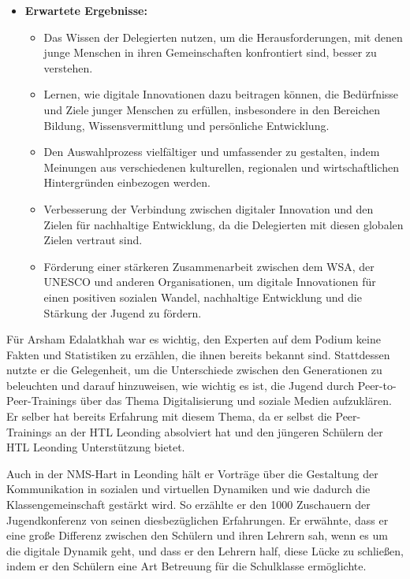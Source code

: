 \begin{itemize}
    \item \textbf{Erwartete Ergebnisse:}
          \begin{itemize}
              \item {Das Wissen der Delegierten nutzen, um die Herausforderungen, mit denen junge Menschen in ihren Gemeinschaften konfrontiert sind, besser zu verstehen.}
              \item {Lernen, wie digitale Innovationen dazu beitragen können, die Bedürfnisse und Ziele junger Menschen zu erfüllen, insbesondere in den Bereichen Bildung, Wissensvermittlung und persönliche Entwicklung.}
              \item {Den Auswahlprozess vielfältiger und umfassender zu gestalten, indem Meinungen aus verschiedenen kulturellen, regionalen und wirtschaftlichen Hintergründen einbezogen werden.}
              \item {Verbesserung der Verbindung zwischen digitaler Innovation und den Zielen für nachhaltige Entwicklung, da die Delegierten mit diesen globalen Zielen vertraut sind.}
              \item {Förderung einer stärkeren Zusammenarbeit zwischen dem WSA, der UNESCO und anderen Organisationen, um digitale Innovationen für einen positiven sozialen Wandel, nachhaltige Entwicklung und die Stärkung der Jugend zu fördern.}
          \end{itemize}
\end{itemize}


Für Arsham Edalatkhah war es wichtig, den Experten auf dem Podium keine Fakten und Statistiken zu erzählen, die ihnen bereits bekannt sind. Stattdessen nutzte er die Gelegenheit, um die Unterschiede zwischen den Generationen zu beleuchten und darauf hinzuweisen, wie wichtig es ist, die Jugend durch Peer-to-Peer-Trainings über das Thema Digitalisierung und soziale Medien aufzuklären. Er selber hat bereits Erfahrung mit diesem Thema, da er selbst die Peer-Trainings an der HTL Leonding absolviert hat und den jüngeren Schülern der HTL Leonding Unterstützung bietet.

Auch in der NMS-Hart in Leonding hält er Vorträge über die Gestaltung der Kommunikation in sozialen und virtuellen Dynamiken und wie dadurch die Klassengemeinschaft gestärkt wird. So erzählte er den 1000 Zuschauern der Jugendkonferenz von seinen diesbezüglichen Erfahrungen. Er erwähnte, dass er eine große Differenz zwischen den Schülern und ihren Lehrern sah, wenn es um die digitale Dynamik geht, und dass er den Lehrern half, diese Lücke zu schließen, indem er den Schülern eine Art Betreuung für die Schulklasse ermöglichte.

